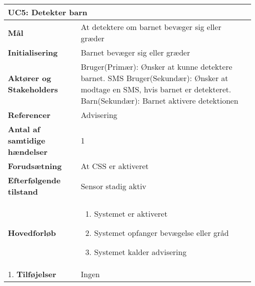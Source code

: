 \begin{table}[H] \centering
\begin{tabular}{|p{6cm}|p{8cm}|}
	\hline
\multicolumn{2}{|l|}{\textbf{UC5: Detekter barn}} \\\hline
\textbf{Mål}								&At detektere om barnet bevæger sig eller græder \\\hline
\textbf{Initialisering}					&Barnet bevæger sig eller græder\\\hline
\textbf{Aktører og Stakeholders}			&Bruger(Primær): Ønsker at kunne detektere barnet. SMS Bruger(Sekundær): 																	Ønsker at modtage en SMS, hvis barnet er detekteret. Barn(Sekundær): Barnet aktivere detektionen 				 \\\hline
\textbf{Referencer}						&Advisering \\\hline
\textbf{Antal af samtidige hændelser}	&1 \\\hline
\textbf{Forudsætning}					&At CSS er aktiveret \\\hline
\textbf{Efterfølgende tilstand}			&Sensor stadig aktiv \\\hline
\textbf{Hovedforløb}						&\begin{enumerate}
	
				\item Systemet er aktiveret
												
				\item Systemet opfanger bevægelse eller gråd
												
				\item Systemet kalder advisering
								
			\end{enumerate}\\\hline1.
\textbf{Tilføjelser}					&Ingen \\\hline
	\end{tabular}
	\label{UC5} 
\end{table}